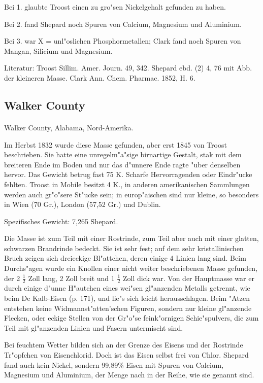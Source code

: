 \documentclass[a4paper, 11pt, oneside]{article}
\begin{document}
Bei 1. glaubte Troost einen zu gro"sen Nickelgehalt gefunden zu haben.

Bei 2. fand Shepard noch Spuren von Calcium, Magnesium und Aluminium.

Bei 3. war X = unl"oslichen Phosphormetallen; Clark fand noch Spuren von Mangan, Silicium und Magnesium.

Literatur: Troost Sillim. Amer. Journ. 49, 342. Shepard ebd. (2) 4, 76 mit Abb. der kleineren Masse. Clark Ann. Chem. Pharmac. 1852, H. 6.

\subsection{Walker County}
\normalsize
\paragraph{}
Walker County, Alabama, Nord-Amerika.

Im Herbst 1832 wurde diese Masse gefunden, aber erst 1845 von Troost beschrieben. Sie hatte eine unregelm"a"sige birnartige Gestalt, stak mit dem breiteren Ende im Boden und nur das d"unnere Ende ragte "uber denselben hervor. Das Gewicht betrug fast 75 K. Scharfe Hervorragenden oder Eindr"ucke fehlten. Troost in Mobile besitzt 4 K., in anderen amerikanischen Sammlungen werden auch gr"o"sere St"ucke sein; in europ"aischen sind nur kleine, so besonders in Wien (70 Gr.), London (57,52 Gr.) und Dublin.

Spezifisches Gewicht: 7,265 Shepard.

Die Masse ist zum Teil mit einer Rostrinde, zum Teil aber auch mit einer glatten, schwarzen Brandrinde bedeckt. Sie ist sehr fest; auf dem sehr kristallinischen Bruch zeigen sich dreieckige Bl"attchen, deren einige 4 Linien lang sind. Beim Durchs"agen wurde ein Knollen einer nicht weiter beschriebenen Masse gefunden, der 2 $\frac{1}{2}$ Zoll lang, 2 Zoll breit und 1 $\frac{1}{2}$ Zoll dick war. Von der Hauptmasse war er durch einige d"unne H"autchen eines wei"sen gl"anzenden Metalls getrennt, wie beim De Kalb-Eisen (p. 171), und lie"s sich leicht herausschlagen. Beim "Atzen entstehen keine Widmannst"atten'schen Figuren, sondern nur kleine gl"anzende Flecken, oder eckige Stellen von der Gr"o"se feink"ornigen Schie"spulvers, die zum Teil mit gl"anzenden Linien und Fasern untermischt sind.

Bei feuchtem Wetter bilden sich an der Grenze des Eisens und der Rostrinde Tr"opfchen von Eisenchlorid. Doch ist das Eisen selbst frei von Chlor. Shepard fand auch kein Nickel, sondern 99,89\% Eisen mit Spuren von Calcium, Magnesium und Aluminium, der Menge nach in der Reihe, wie sie genannt sind.
\end{document}
